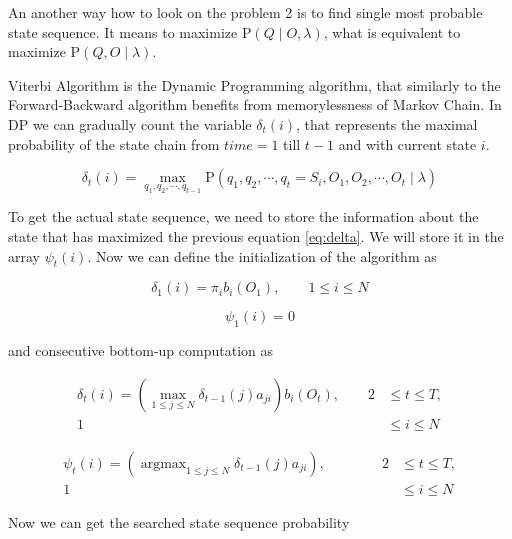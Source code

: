 \documentclass[thesis=M,english]{FITthesis}[2012/10/20]
\newcommand{\argmax}{\mathop{\mathrm{argmax}}}
\begin{document}
An another way how to look on the problem 2 is to find single most probable state sequence. It means to maximize $\mathrm{P}(Q\mid O,\lambda)$, what is equivalent to maximize $\mathrm{P}(Q,O\mid\lambda)$.

Viterbi Algorithm is the Dynamic Programming algorithm, that similarly to the Forward-Backward algorithm  benefits from memorylessness of Markov Chain. In DP we can gradually count the variable $\delta_t(i)$, that represents the maximal probability of the state chain from $time = 1$ till $t-1$ and with current state $i$.

\begin{equation}\label{eq:delta}
\delta_t(i) = \max_{q_1,q_2,\cdots,q_{t-1}} \mathrm{P}( q_1,q_2,\cdots, q_t = S_i, O_1, O_2, \cdots, O_t \mid \lambda )
\end{equation}

To get the actual state sequence, we need to store the information about the state that has maximized the previous equation \eqref{eq:delta}. We will store it in the array $\psi_t(i)$. Now we can define the initialization of the algorithm as

\begin{equation}
\delta_1(i) = \pi_i b_i(O_1), \qquad 1 \leq i \leq N 
\end{equation}

\begin{equation}
\psi_1(i) = 0 
\end{equation}

and consecutive bottom-up computation as

\begin{equation}
\begin{aligned}
\delta_{t}(i) = ( \max_{ 1 \leq j \leq N } \delta_{t-1}(j)a_{ji} ) b_i(O_{t}), \qquad 2& \leq t \leq T, \\
																					   1& \leq i \leq N
\end{aligned}
\end{equation}

\begin{equation}
\begin{aligned}
\psi_{t}(i) = ( \argmax_{ 1 \leq j \leq N } \delta_{t-1}(j)a_{ji} ), \qquad \qquad 2& \leq t \leq T, \\
																			1& \leq i \leq N
\end{aligned}
\end{equation}

Now we can get the searched state sequence probability 
\end{document}

